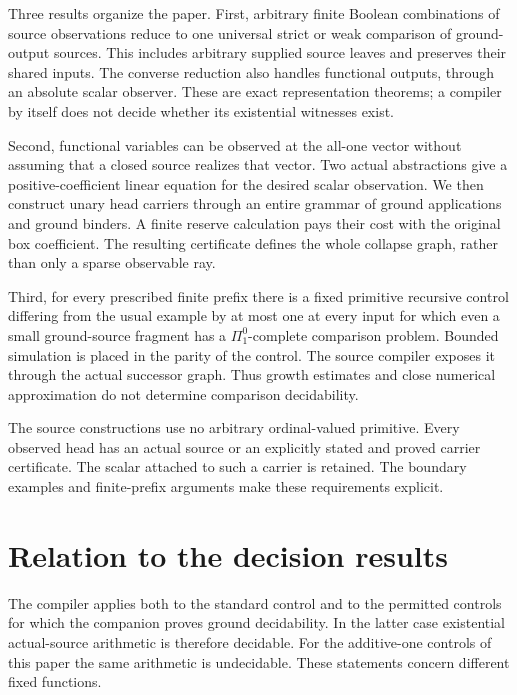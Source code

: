 \documentclass[11pt,a4paper]{article}
\numberwithin{equation}{section}
\theoremstyle{definition}
\theoremstyle{remark}
\begin{document}
Three results organize the paper. First, arbitrary finite Boolean
combinations of source observations reduce to one universal strict or
weak comparison of ground-output sources. This includes arbitrary
supplied source leaves and preserves their shared inputs. The converse
reduction also handles functional outputs, through an absolute scalar
observer. These are exact representation theorems; a compiler by itself
does not decide whether its existential witnesses exist.

Second, functional variables can be observed at the all-one vector
without assuming that a closed source realizes that vector. Two actual
abstractions give a positive-coefficient linear equation for the desired
scalar observation. We then construct unary head carriers through an
entire grammar of ground applications and ground binders. A finite
reserve calculation pays their cost with the original box coefficient.
The resulting certificate defines the whole collapse graph, rather than
only a sparse observable ray.

Third, for every prescribed finite prefix there is a fixed primitive
recursive control differing from the usual example by at most one at
every input for which even a small ground-source fragment has a
$\Pi^0_1$-complete comparison problem. Bounded simulation is placed in
the parity of the control. The source compiler exposes it through the
actual successor graph. Thus growth estimates and close numerical
approximation do not determine comparison decidability.

The source constructions use no arbitrary ordinal-valued primitive.
Every observed head has an actual source or an explicitly stated and
proved carrier certificate. The scalar attached to such a carrier is
retained. The boundary examples and finite-prefix arguments make these
requirements explicit.








\section{Relation to the decision results}

The compiler applies both to the standard control and to the permitted
controls for which the companion proves ground decidability. In the
latter case existential actual-source arithmetic is therefore decidable.
For the additive-one controls of this paper the same arithmetic is
undecidable. These statements concern different fixed functions.
\end{document}
